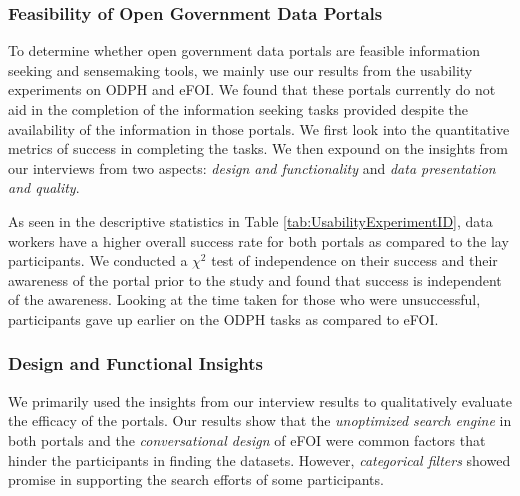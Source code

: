 \documentclass{sigchi}
\begin{document}
\subsubsection{Feasibility of Open Government Data Portals}
To determine whether open government data portals are feasible information seeking and sensemaking tools, we mainly use our results from the usability experiments on ODPH and eFOI. We found that these portals currently do not aid in the completion of the information seeking tasks provided despite the availability of the information in those portals. We first look into the quantitative metrics of success in completing the tasks. We then expound on the insights from our interviews from two aspects: \textit{design and functionality} and \textit{data presentation and quality}.

As seen in the descriptive statistics in Table \ref{tab:UsabilityExperimentID}, data workers have a higher overall success rate for both portals as compared to the lay participants. We conducted a $\chi^2$ test of independence on their success and their awareness of the portal prior to the study and found that success is independent of the awareness. Looking at the time taken for those who were unsuccessful, participants gave up earlier on the ODPH tasks as compared to eFOI. 



\subsubsection{Design and Functional Insights}
We primarily used the insights from our interview results to qualitatively evaluate the efficacy of the portals. Our results show that the \textit{unoptimized search engine} in both portals and the  \textit{conversational design} of eFOI were common factors that hinder the participants in finding the datasets. However, \textit{categorical filters} showed promise in supporting the search efforts of some participants.
\end{document}
